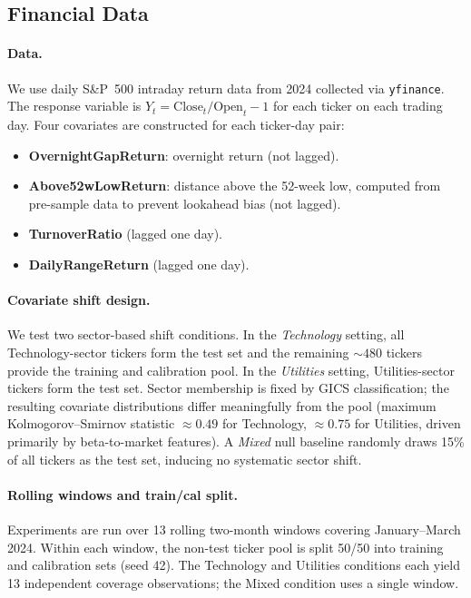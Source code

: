 
\subsection{Financial Data}
\label{sec:experiments:finance}

\paragraph{Data.}
We use daily S\&P~500 intraday return data from 2024 collected via
\texttt{yfinance}.  The response variable is
$Y_t = \mathrm{Close}_t / \mathrm{Open}_t - 1$ for each ticker on each
trading day.  Four covariates are constructed for each ticker-day pair:
%
\begin{itemize}[nosep]
  \item \textbf{OvernightGapReturn}: overnight return (not lagged).
  \item \textbf{Above52wLowReturn}: distance above the 52-week low, computed
        from pre-sample data to prevent lookahead bias (not lagged).
  \item \textbf{TurnoverRatio} (lagged one day).
  \item \textbf{DailyRangeReturn} (lagged one day).
\end{itemize}

\paragraph{Covariate shift design.}
We test two sector-based shift conditions.  In the \emph{Technology} setting,
all Technology-sector tickers form the test set and the remaining $\sim\!480$
tickers provide the training and calibration pool.  In the \emph{Utilities}
setting, Utilities-sector tickers form the test set.  Sector membership is
fixed by GICS classification; the resulting covariate distributions differ
meaningfully from the pool (maximum Kolmogorov–Smirnov statistic $\approx
0.49$ for Technology, $\approx 0.75$ for Utilities, driven primarily by
beta-to-market features).  A \emph{Mixed} null baseline randomly draws 15\%
of all tickers as the test set, inducing no systematic sector shift.

\paragraph{Rolling windows and train/cal split.}
Experiments are run over 13 rolling two-month windows covering
January--March 2024.  Within each window, the non-test ticker pool is split
50/50 into training and calibration sets (seed 42).  The Technology and
Utilities conditions each yield 13 independent coverage observations; the
Mixed condition uses a single window.

